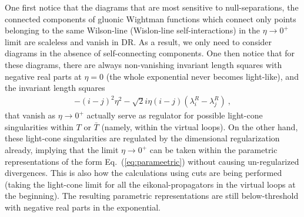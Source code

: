 \documentclass[a4paper,11pt]{article}
\begin{document}
One first notice that the diagrams that are most sensitive to null-separations, the connected components of gluonic Wightman functions which connect only points belonging to the same Wilson-line (Wislon-line self-interactions) in the $\eta \rightarrow 0^+$ limit are scaleless and vanish in DR. As a result, we only need to consider diagrams in the absence of self-connecting components. One then notice that for these diagrams, there are always non-vanishing invariant length squares with negative real parts at $\eta =0$ (the whole exponential never becomes light-like), and the invariant length squares
\begin{align}
-(i-j)^2\eta^2-\sqrt{2}i\eta(i-j)(\lambda^R_i-\lambda^R_j) \ ,
\end{align}
that vanish as $\eta \rightarrow 0^+$ actually serve as regulator for possible light-cone singularities within $T$ or $\bar T$ (namely, within the virtual loops).  On the other hand, these light-cone singularities are regulated by the dimensional regularization already, implying that the limit $\eta\rightarrow 0^+$ can be taken within the parametric representations of the form Eq.~(\ref{eq:parameetric}) without causing un-regularized divergences. This is also how the calculations using cuts are being performed (taking the light-cone limit for all the eikonal-propagators in the virtual loops at the beginning). The resulting parametric representations are still below-threshold with negative real parts in the exponential.  
\end{document}
